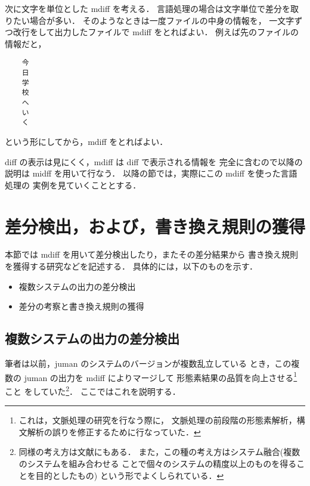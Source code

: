 次に文字を単位とした mdiff を考える．
言語処理の場合は文字単位で差分を取りたい場合が多い．
そのようなときは一度ファイルの中身の情報を，
一文字ずつ改行をして出力したファイルで mdiff をとればよい．
例えば先のファイルの情報だと，
\begin{verbatim}
    今
    日
    学
    校
    へ
    い
    く
\end{verbatim}
という形にしてから，mdiff をとればよい．

diff の表示は見にくく，mdiff は diff で表示される情報を
完全に含むので以降の説明は midff を用いて行なう．
以降の節では，実際にこの mdiff を使った言語処理の
実例を見ていくこととする．

\section{差分検出，および，書き換え規則の獲得}

本節では mdiff を用いて差分検出したり，またその差分結果から
書き換え規則を獲得する研究などを記述する．
具体的には，以下のものを示す．
\begin{itemize}
\item 
  複数システムの出力の差分検出

\item 
  差分の考察と書き換え規則の獲得

\end{itemize}

\subsection{複数システムの出力の差分検出}
\label{sec:system}

筆者は以前，juman のシステムのバージョン\cite{juman,araya_juman}が複数乱立している
とき，この複数の juman の出力を mdiff によりマージして
形態素結果の品質を向上させる\footnote{これは，文脈処理の研究\cite{murata_shuuron,murata_noun_nlp,murata_deno_nlp}を行なう際に，
文脈処理の前段階の形態素解析，構文解析の誤りを修正するために行なっていた．}こと
をしていた\footnote{同様の考え方は文献\cite{fujii1998}にもある．
また，この種の考え方はシステム融合(複数のシステムを組み合わせる
ことで個々のシステムの精度以上のものを得ることを目的としたもの)
という形でよくしられている\cite{murata_nlc2001_wsd}．}．
ここではこれを説明する．

